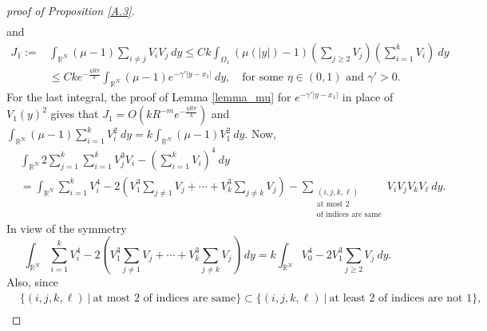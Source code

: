 \documentclass{amsart}
\theoremstyle{definition}
\theoremstyle{remark}
\numberwithin{equation}{section}
\begin{document}
\begin{proof}[proof of Proposition \ref{A.3}]
\begin{equation}
\begin{aligned}
\end{aligned}
\end{equation}
and  
\begin{align*}
J_1:=&\int_{\mathbb{R}^N}(\mu-1)  \sum_{i\ne j} V_iV_j\:dy \le Ck\int_{\Omega_{1}}(\mu(|y|)-1)  \left(\sum_{j\ge 2}V_j\right)\left(\sum_{i=1}^k V_i\right)\:dy\\
&\le Ck e^{-\frac{\eta R \pi}{k}} \int_{\mathbb{R}^N} (\mu-1) e^{-\gamma'|y-x_1|} \:dy, \quad \text{for some $\eta \in (0,1)$ and $\gamma'>0$}.
\end{align*}
For the last integral, the proof of Lemma \ref{lemma_mu} for $e^{-\gamma'|y-x_1|}$ in place of $V_1(y)^2$ gives that $J_1 = O\left (k R^{-m} e^{-\frac{\eta R \pi}{k}}\right)$ and $\displaystyle\int_{\mathbb{R}^{N}}(\mu-1) \sum_{i=1}^k V_{i}^2 \:dy = k\int_{\mathbb{R}^{N}}(\mu-1) V_1^2 \:dy$.
Now,
\begin{align*}
&\int_{\mathbb{R}^{N}} 2\sum_{j=1}^{k} \sum_{i=1}^{k} V_j^{3} V_i - \left(\sum_{i=1}^k V_i\right)^4\:dy\\
&=\int_{\mathbb{R}^{N}} \sum_{i=1}^k V_i^4 - 2 \left(V_1^3 \sum_{j\ne 1} V_j + \cdots + V_k^3 \sum_{j\ne k} V_j \right) - \sum_{\substack{(i,j,k,\ell)\\ \text{at most 2} \\ \text{of indices are same}} }V_iV_j V_k V_\ell \:dy.
\end{align*}
In view of  the symmetry
$$ \int_{\mathbb{R}^{N}} \sum_{i=1}^k V_i^4 - 2 \left(V_1^3 \sum_{j\ne 1} V_j + \cdots + V_k^3 \sum_{j\ne k} V_j \right) \:dy =  k\int_{\mathbb{R}^{N}} V_0^4  -2  V_1^3 \sum_{j\ge 2} V_j \:dy.$$
%
Also, since
\begin{align*}
&\{ (i,j,k,\ell)~|~ \text{at most 2 of indices are same}\} \subset \{ (i,j,k,\ell)~|~ \text{at least 2 of indices are not $1$} \}, \\

\end{align*}
\end{proof}
\end{document}
